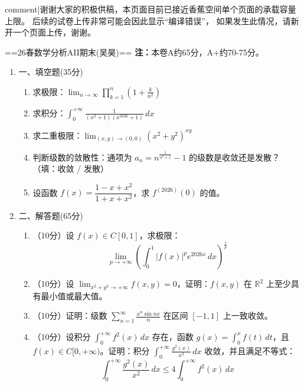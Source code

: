 
{{comment|谢谢大家的积极供稿，本页面目前已接近香蕉空间单个页面的承载容量上限。
后续的试卷上传非常可能会因此显示``编译错误''，
如果发生此情况，请新开一个页面上传，谢谢。}}

==26春数学分析AII期末(吴昊)==
\textbf{注：}本卷A约65分，A+约70-75分。
\begin{enumerate}
\item 一、填空题(35分)
\begin{enumerate}[label=\arabic*.]
\item 求极限：$\displaystyle \lim_{n \to \infty} \prod_{k=1}^n \left( 1 + \frac{k}{n^2} \right)$
\item 求积分：$\displaystyle \int_0^{+\infty} \frac{1}{(x^2+1)(x^{2026}+1)} \, dx$
\item 求二重极限：$\displaystyle \lim_{(x, y) \to (0, 0)} (x^2 + y^2)^{xy}$
\item 判断级数的敛散性：通项为 $a_n = n^{\frac{1}{n^2+1}} - 1$ 的级数是收敛还是发散？（填：收敛 / 发散）
\item 设函数 $f(x) = \dfrac{1-x+x^2}{1+x+x^2}$，求 $f^{(2026)}(0)$ 的值。
\end{enumerate}

\item 二、解答题(65分)
\begin{enumerate}[label=\arabic*.]
\item （10分）设 $f(x) \in C[0, 1]$，求极限：
\[
\lim_{p \to +\infty} \left( \int_0^1 |f(x)|^p e^{2026x} \, dx \right)^{\frac{1}{p}}
\]

\item （10分）设 $\displaystyle \lim_{x^2+y^2 \to +\infty} f(x, y) = 0$，证明：$f(x, y)$ 在 $\mathbb{R}^2$ 上至少具有最小值或最大值。

\item （10分）证明：级数 $\displaystyle \sum_{n=1}^{\infty} \frac{x^n \sin nx}{n}$ 在区间 $[-1, 1]$ 上一致收敛。

\item （10分）设积分 $\displaystyle \int_0^{+\infty} f^2(x) \, dx$ 存在，函数 $g(x) = \int_0^x f(t) \, dt$，且 $f(x) \in C[0, +\infty)$。证明：积分 $\displaystyle \int_0^{+\infty} \frac{g^2(x)}{x^2} \, dx$ 收敛，并且满足不等式：
\[
\int_0^{+\infty} \frac{g^2(x)}{x^2} \, dx \le 4 \int_0^{+\infty} f^2(x) \, dx
\]


\end{enumerate}
\end{enumerate}
